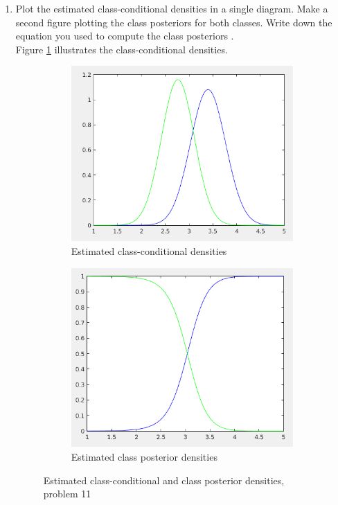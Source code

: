 \documentclass[12pt]{article}
\begin{document}
\begin{enumerate}
\begin{center}
\line(1,0){250}
\end{center}

\item Plot the estimated class-conditional densities in a single diagram. Make a second figure plotting the class posteriors for both classes. Write down the equation you used to compute the class posteriors .\\
Figure \ref{fig:11-2} illustrates the class-conditional densities. 

\begin{figure}[h]
\centering
\begin{subfigure}{0.4\textwidth}
\centering
\includegraphics[scale=0.3]{Imgs/11-2.png}
\caption{Estimated class-conditional densities}
\end{subfigure}
\begin{subfigure}{0.4\textwidth}
\includegraphics[scale=0.3]{Imgs/11-3.png}
\caption{Estimated class posterior densities}
\end{subfigure}
\caption{Estimated class-conditional and class posterior densities, problem 11}
\label{fig:11-2}
\end{figure}


\end{enumerate}
\end{document}
